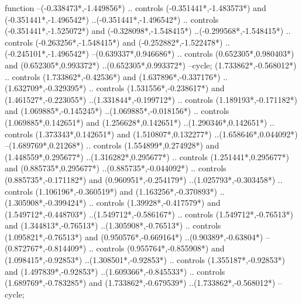 {\begin{scope}[x=1mm,y=1mm,line width=\SCstroke mm,line cap=round,line join=round]
\begin{SCpart}{function}
--({-0.338473*\SCF},{-1.449856*\SCF})
.. controls ({-0.351441*\SCF},{-1.483573*\SCF}) and ({-0.351441*\SCF},{-1.496542*\SCF}) ..({-0.351441*\SCF},{-1.496542*\SCF})
.. controls ({-0.351441*\SCF},{-1.525072*\SCF}) and ({-0.328098*\SCF},{-1.548415*\SCF}) ..({-0.299568*\SCF},{-1.548415*\SCF})
.. controls ({-0.263256*\SCF},{-1.548415*\SCF}) and ({-0.252882*\SCF},{-1.522478*\SCF}) ..({-0.245101*\SCF},{-1.496542*\SCF})
--({0.639337*\SCF},{0.946686*\SCF})
.. controls ({0.652305*\SCF},{0.980403*\SCF}) and ({0.652305*\SCF},{0.993372*\SCF}) ..({0.652305*\SCF},{0.993372*\SCF})
--cycle;
 ({1.733862*\SCF},{-0.568012*\SCF})
.. controls ({1.733862*\SCF},{-0.42536*\SCF}) and ({1.637896*\SCF},{-0.337176*\SCF}) ..({1.632709*\SCF},{-0.329395*\SCF})
.. controls ({1.531556*\SCF},{-0.238617*\SCF}) and ({1.461527*\SCF},{-0.223055*\SCF}) ..({1.331844*\SCF},{-0.199712*\SCF})
.. controls ({1.189193*\SCF},{-0.171182*\SCF}) and ({1.069885*\SCF},{-0.145245*\SCF}) ..({1.069885*\SCF},{-0.018156*\SCF})
.. controls ({1.069885*\SCF},{0.142651*\SCF}) and ({1.256628*\SCF},{0.142651*\SCF}) ..({1.290346*\SCF},{0.142651*\SCF})
.. controls ({1.373343*\SCF},{0.142651*\SCF}) and ({1.510807*\SCF},{0.132277*\SCF}) ..({1.658646*\SCF},{0.044092*\SCF})
--({1.689769*\SCF},{0.21268*\SCF})
.. controls ({1.554899*\SCF},{0.274928*\SCF}) and ({1.448559*\SCF},{0.295677*\SCF}) ..({1.316282*\SCF},{0.295677*\SCF})
.. controls ({1.251441*\SCF},{0.295677*\SCF}) and ({0.885735*\SCF},{0.295677*\SCF}) ..({0.885735*\SCF},{-0.044092*\SCF})
.. controls ({0.885735*\SCF},{-0.171182*\SCF}) and ({0.960951*\SCF},{-0.254179*\SCF}) ..({1.025793*\SCF},{-0.303458*\SCF})
.. controls ({1.106196*\SCF},{-0.360519*\SCF}) and ({1.163256*\SCF},{-0.370893*\SCF}) ..({1.305908*\SCF},{-0.399424*\SCF})
.. controls ({1.39928*\SCF},{-0.417579*\SCF}) and ({1.549712*\SCF},{-0.448703*\SCF}) ..({1.549712*\SCF},{-0.586167*\SCF})
.. controls ({1.549712*\SCF},{-0.76513*\SCF}) and ({1.344813*\SCF},{-0.76513*\SCF}) ..({1.305908*\SCF},{-0.76513*\SCF})
.. controls ({1.095821*\SCF},{-0.76513*\SCF}) and ({0.950576*\SCF},{-0.669164*\SCF}) ..({0.90389*\SCF},{-0.63804*\SCF})
--({0.872767*\SCF},{-0.814409*\SCF})
.. controls ({0.955764*\SCF},{-0.855908*\SCF}) and ({1.098415*\SCF},{-0.92853*\SCF}) ..({1.308501*\SCF},{-0.92853*\SCF})
.. controls ({1.355187*\SCF},{-0.92853*\SCF}) and ({1.497839*\SCF},{-0.92853*\SCF}) ..({1.609366*\SCF},{-0.845533*\SCF})
.. controls ({1.689769*\SCF},{-0.783285*\SCF}) and ({1.733862*\SCF},{-0.679539*\SCF}) ..({1.733862*\SCF},{-0.568012*\SCF})
--cycle;
\end{SCpart}
\end{scope}
}
